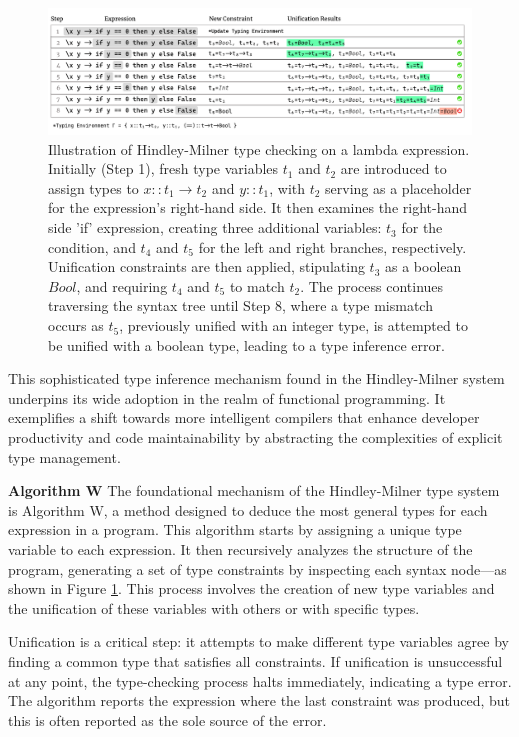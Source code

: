 \begin{figure}[hbt]
    \centering    \includegraphics[width=\linewidth]{HindleyMilner}
    \caption[Illustration of Hindley-Milner type checking on a lambda expression]{
      \label{fig:hindley-milner}
      Illustration of Hindley-Milner type checking on a lambda expression. Initially (Step 1), fresh type variables $t_1$  and $ t_2 $ are introduced to assign types to $x :: t_1 \to t_2$ and $y :: t_1$, with $ t_2$ serving as a placeholder for the expression’s right-hand side. It then examines the right-hand side 'if' expression, creating three additional variables: $t_3$ for the condition, and $t_4$ and $t_5$ for the left and right branches, respectively. Unification constraints are then applied, stipulating $t_3$ as a boolean $Bool$, and requiring $t_4$ and $t_5$ to match $t_2$. The process continues traversing the syntax tree until Step 8, where a type mismatch occurs as $t_5$, previously unified with an integer type, is attempted to be unified with a boolean type, leading to a type inference error.
       }
\end{figure}

This sophisticated type inference mechanism found in the Hindley-Milner system underpins its wide adoption in the realm of functional programming. It exemplifies a shift towards more intelligent compilers that enhance developer productivity and code maintainability by abstracting the complexities of explicit type management.

\textbf{Algorithm W}  The foundational mechanism of the Hindley-Milner type system is Algorithm W, a method designed to deduce the most general types for each expression in a program. This algorithm starts by assigning a unique type variable to each expression. It then recursively analyzes the structure of the program, generating a set of type constraints by inspecting each syntax node—as shown in Figure \ref{fig:hindley-milner}. This process involves the creation of new type variables and the unification of these variables with others or with specific types.

Unification is a critical step: it attempts to make different type variables agree by finding a common type that satisfies all constraints. If unification is unsuccessful at any point, the type-checking process halts immediately, indicating a type error. The algorithm reports the expression where the last constraint was produced, but this is often reported as the sole source of the error.


